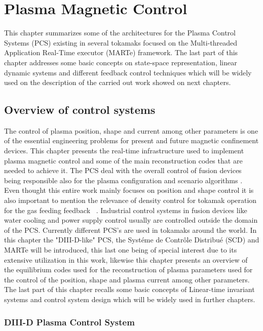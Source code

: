 \chapter{Plasma Magnetic Control}
\label{Chap2}

This chapter summarizes some of the architectures for the Plasma Control Systems (PCS) existing in several tokamaks focused on the  Multi-threaded Application Real-Time executor (MARTe) framework.  The last part of this chapter addresses some basic concepts on state-space representation, linear dynamic systems and different feedback control techniques which will be widely used on the description of the carried out work showed on next chapters. 

\section{Overview of control systems}
The control of  plasma position, shape and current among other parameters is one of the essential engineering problems for present and future magnetic confinement devices. This chapter presents the real-time infrastructure used to implement plasma magnetic control and  some of the main reconstruction codes that are needed to achieve it. The PCS deal with the overall control of  fusion devices being responsible also for the  plasma configuration and scenario algorithms \cite[Chapter~8]{PCS_2018}. Even thought this entire work mainly focuses on position and shape control it is also important to mention the relevance of density control for tokamak operation for the gas feeding feedback ~\cite{densityControl}. Industrial control systems in fusion devices like water cooling and power supply control usually are controlled outside the domain of the PCS. Currently different PCS's are used in  tokamaks around the world. In this chapter the "DIII-D-like" PCS, the Syst\'eme de Contr\^ole Distribu\'e (SCD) and MARTe will be introduced, this last one being of special interest due to its extensive utilization in this work, likewise this chapter presents an overview of the equilibrium codes  used for the reconstruction of plasma parameters used for the control of the  position, shape and plasma current among other parameters. The last part of this chapter recalls some basic concepts of Linear-time invariant systems and control system design which will be widely used in further chapters.


\subsection{DIII-D Plasma Control System}  


